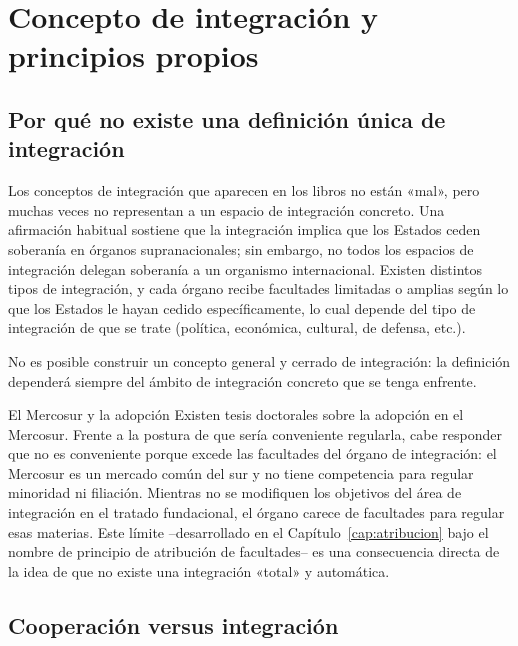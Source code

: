 \documentclass[12pt,oneside]{book}
\renewcommand{\chaptermark}[1]{\markboth{\thechapter.\ #1}{}}
\begin{document}
\chapter{Concepto de integración y principios propios}
\chaptermark{Concepto y principios}

\section{Por qué no existe una definición única de integración}

Los conceptos de integración que aparecen en los libros no están «mal», pero muchas veces no representan a un espacio de integración concreto. Una afirmación habitual sostiene que la integración implica que los Estados ceden soberanía en órganos supranacionales; sin embargo, no todos los espacios de integración delegan soberanía a un organismo internacional. Existen distintos tipos de integración, y cada órgano recibe facultades limitadas o amplias según lo que los Estados le hayan cedido específicamente, lo cual depende del tipo de integración de que se trate (política, económica, cultural, de defensa, etc.).

\begin{importante}
No es posible construir un concepto general y cerrado de integración: la definición dependerá siempre del ámbito de integración concreto que se tenga enfrente.
\end{importante}

\begin{ejemplo}{El Mercosur y la adopción}
Existen tesis doctorales sobre la adopción en el Mercosur. Frente a la postura de que sería conveniente regularla, cabe responder que no es conveniente porque excede las facultades del órgano de integración: el Mercosur es un mercado común del sur y no tiene competencia para regular minoridad ni filiación. Mientras no se modifiquen los objetivos del área de integración en el tratado fundacional, el órgano carece de facultades para regular esas materias. Este límite --desarrollado en el Capítulo~\ref{cap:atribucion} bajo el nombre de principio de atribución de facultades-- es una consecuencia directa de la idea de que no existe una integración «total» y automática.
\end{ejemplo}

\section{Cooperación versus integración}
\end{document}
